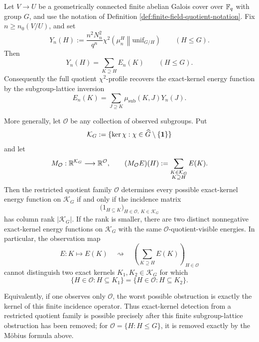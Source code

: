 \begin{theorem}\label{thm:finite-field-exact-kernel-visibility-obstruction}
Let \(V\to U\) be a geometrically connected finite \etale{} abelian Galois
cover over \(\mathbb{F}_q\) with group \(G\), and use the notation of Definition
\ref{def:finite-field-quotient-notation}.  Fix \(n\ge n_0(V/U)\), and set
\[
Y_n(H):=\frac{n^2N_n^2}{q^n}
\chi^2\!\left(\mu_n^H\middle\|\mathrm{unif}_{G/H}\right)
\qquad(H\le G).
\]
Then
\[
Y_n(H)=\sum_{K\supseteq H}E_n(K)
\qquad(H\le G).
\]
Consequently the full quotient \(\chi^2\)-profile recovers the exact-kernel
energy function by the subgroup-lattice inversion
\[
E_n(K)=\sum_{J\supseteq K}\mu_{\mathrm{sub}}(K,J)Y_n(J).
\]

More generally, let \(\mathcal O\) be any collection of observed subgroups.
Put
\[
\mathcal K_G:=\{\ker\chi:\chi\in\widehat G\setminus\{\mathbf{1}\}\}
\]
and let
\[
M_{\mathcal O}:\mathbb{R}^{\mathcal K_G}\longrightarrow \mathbb{R}^{\mathcal O},
\qquad
(M_{\mathcal O}E)(H):=\sum_{\substack{K\in\mathcal K_G\\K\supseteq H}}E(K).
\]
Then the restricted quotient family \(\mathcal O\) determines every possible
exact-kernel energy function on \(\mathcal K_G\) if and only if the incidence
matrix
\[
\bigl(1_{H\subseteq K}\bigr)_{H\in\mathcal O,\ K\in\mathcal K_G}
\]
has column rank \(|\mathcal K_G|\). If the rank is smaller, there are two
distinct nonnegative exact-kernel energy functions on \(\mathcal K_G\) with the
same \(\mathcal O\)-quotient-visible energies. In particular, the observation map
\[
E:K\longmapsto E(K)
\quad\rightsquigarrow\quad
\left(\sum_{K\supseteq H}E(K)\right)_{H\in\mathcal O}
\]
cannot distinguish two exact kernels \(K_1,K_2\in\mathcal K_G\) for which
\[
\{H\in\mathcal O:H\subseteq K_1\}
=
\{H\in\mathcal O:H\subseteq K_2\}.
\]

Equivalently, if one observes only \(\mathcal O\), the worst possible obstruction
is exactly the kernel of this finite incidence operator.  Thus exact-kernel
detection from a restricted quotient family is possible precisely after this
finite subgroup-lattice obstruction has been removed; for
\(\mathcal O=\{H:H\le G\}\), it is removed exactly by the M\"obius formula above.
\end{theorem}

